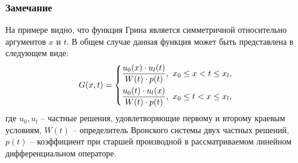 	\subsubsection*{Замечание}

		На примере видно, что функция Грина является симметричной относительно аргументов $x$ и $t$. В общем случае данная функция может быть представлена в следующем виде:
		\[ G(x, t) = \left\lbrace \begin{aligned} 
			& \frac{u_0(x) \cdot u_l(t)}{W(t) \cdot p(t)}, ~ x_0 \le x < t \le x_l, \\
			& \frac{u_0(t) \cdot u_l(x)}{W(t) \cdot p(t)}, ~ x_0 \le t < x \le x_l,
		 \end{aligned} \right. \]
		где $u_0, u_l$ -- частные решения, удовлетворяющие первому и второму краевым условиям, $W(t)$ -- определитель Вронского системы двух частных решений, $p(t)$ -- коэффициент при старшей производной в рассматриваемом линейном дифференциальном операторе. 

